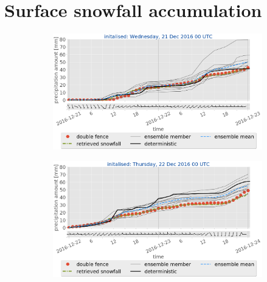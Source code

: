\section{Surface snowfall accumulation}\label{sec:sfc_acc}
\begin{figure}[t!]
	\centering
	\begin{subfigure}[t]{0.49\textwidth}		\includegraphics[trim={0.cm 5.2cm 0.cm 0cm},clip,width=\textwidth]{./fig_sfc_acc/acc_wind_20161221_00}
		\caption{}\label{fig:sfc_acc21}
	\end{subfigure}
	\begin{subfigure}[t]{0.49\textwidth}		\includegraphics[trim={0.cm 5.2cm 0.cm 0cm},clip,width=\textwidth]{./fig_sfc_acc/acc_wind_20161222_00}
		\caption{}\label{fig:sfc_acc22}
	\end{subfigure}

\end{figure}
